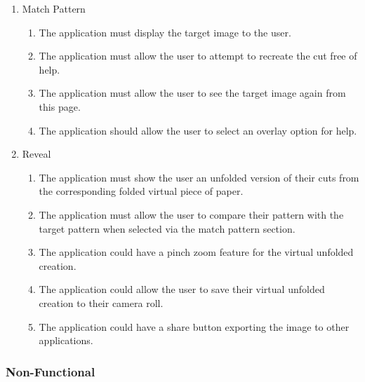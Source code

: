 \documentclass[11pt]{article}
\begin{document}
\begin{enumerate}
      \item Match Pattern
        \begin{enumerate}[label*=\arabic*.]
        \item The application must display the target image to the user.
        \item The application must allow the user to attempt to recreate the cut free of help. 
        \item The application must allow the user to see the target image again from this page. 
        \item The application should allow the user to select an overlay option for help.
      \end{enumerate}

       \item Reveal
          \begin{enumerate}[label*=\arabic*.]
            \item The application must show the user an unfolded version of their cuts from the corresponding folded virtual piece of paper. 
            \item The application must allow the user to compare their pattern with the target pattern when selected via the match pattern section.
            \item The application could have a pinch zoom feature for the virtual unfolded creation.
            \item The application could allow the user to save their virtual unfolded creation to their camera roll.
            \item The application could have a share button exporting the image to other applications. 
          \end{enumerate}
        \end{enumerate}

    
   \subsubsection{ Non-Functional}
    
\end{document}
